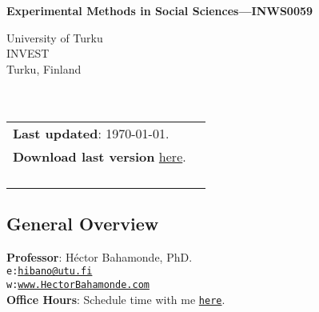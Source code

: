 \documentclass[letterpaper]{article}
\def\name{Experimental Methods in Social Sciences---INWS0059}
\begin{document}

\centerline{\huge \bf \name}



\vspace{0.25in}

\begin{minipage}{0.45\linewidth}
 University of Turku \\
  INVEST \\
  Turku, Finland\\
  \\
  \\

\end{minipage}
\hspace{4cm}\begin{minipage}{0.45\linewidth}
  \begin{tabular}{ll}
{\bf Last updated}: \today. \\
 {\bf Download last version} \href{https://github.com/hbahamonde/Exp_Soc_Science/raw/main/Bahamonde_Exp_Soc_Sci.pdf}{here}.%
    \\
    \\
    \\
    \\
    \\
  \end{tabular}
\end{minipage}

\subsection*{General Overview}


\vspace{1mm}
{\bf Professor}: H\'ector Bahamonde, PhD.\\
\texttt{e:}\href{mailto:hibano@utu.fi}{\texttt{hibano@utu.fi}}\\
\texttt{w:}\href{http://www.hectorbahamonde.com}{\texttt{www.HectorBahamonde.com}}\\
{\bf Office Hours}: Schedule time with me \href{https://calendly.com/bahamonde}{\texttt{here}}.\\
\end{document}
